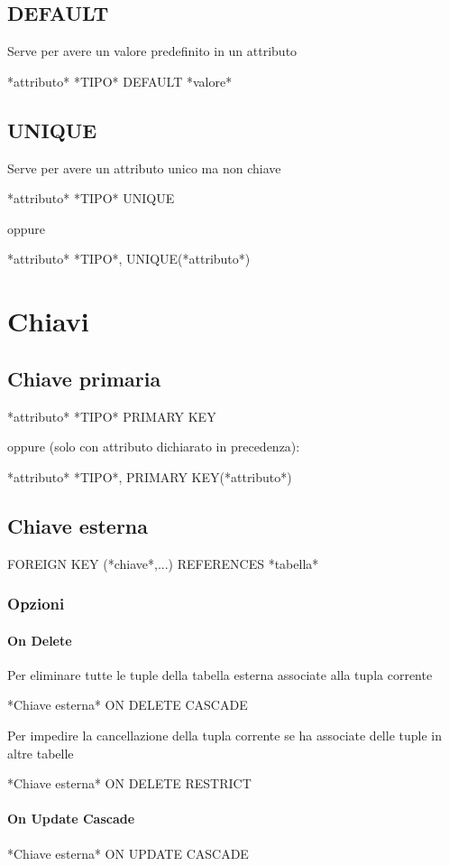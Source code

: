 \documentclass[12pt]{report}
\begin{document}
\section{DEFAULT}
Serve per avere un valore predefinito in un attributo
\begin{spverbatim}
    *attributo* *TIPO* DEFAULT *valore*
\end{spverbatim}
\section{UNIQUE}
Serve per avere un attributo unico ma non chiave
\begin{spverbatim}
    *attributo* *TIPO* UNIQUE
\end{spverbatim}
oppure
\begin{spverbatim}
    *attributo* *TIPO*,
    UNIQUE(*attributo*)
\end{spverbatim}
\chapter{Chiavi}
\section{Chiave primaria}
\begin{spverbatim}
    *attributo* *TIPO* PRIMARY KEY
\end{spverbatim}
oppure (solo con attributo dichiarato in precedenza):
\begin{spverbatim}
    *attributo* *TIPO*,
    PRIMARY KEY(*attributo*)
\end{spverbatim}
\section{Chiave esterna}
    FOREIGN KEY (*chiave*,...) REFERENCES *tabella*
\subsection{Opzioni}
\subsubsection{On Delete}
    Per eliminare tutte le tuple della tabella esterna associate alla tupla corrente
    \begin{spverbatim}
        *Chiave esterna* ON DELETE CASCADE
    \end{spverbatim}
    Per impedire la cancellazione della tupla corrente se ha associate delle tuple in altre tabelle
    \begin{spverbatim}
        *Chiave esterna* ON DELETE RESTRICT
    \end{spverbatim}
\subsubsection{On Update Cascade}
\begin{spverbatim}
    *Chiave esterna* ON UPDATE CASCADE
\end{spverbatim}
\end{document}
